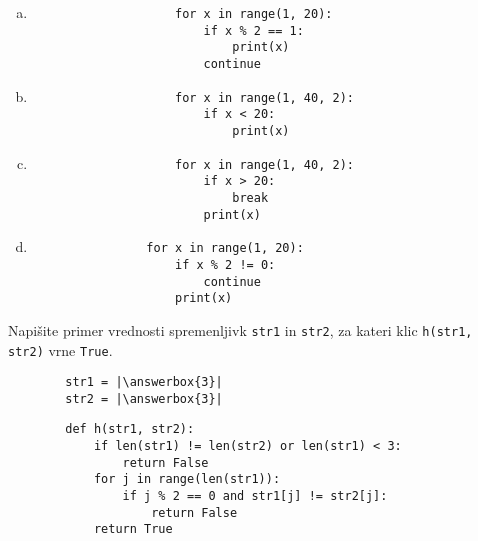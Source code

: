 \documentclass[arhiv, 10pt]{../izpit}
\newcommand{\inlinepy}[1]{\texttt{#1}}
\newcommand{\answerbox}[1]{\framebox{\vphantom{\large M}\hspace{#1cm}}}
\begin{document}
        \begin{multicols}{2}
        \begin{enumerate}[(a)]
\item 
                \begin{verbatim}
                    for x in range(1, 20):
                        if x % 2 == 1:
                            print(x)
                        continue
                \end{verbatim}
            
\item 
                \begin{verbatim}
                    for x in range(1, 40, 2):
                        if x < 20:
                            print(x)
                \end{verbatim}
            
\item 
                \begin{verbatim}
                    for x in range(1, 40, 2):
                        if x > 20:
                            break
                        print(x)
                \end{verbatim}
            
\item 
            \begin{verbatim}
                for x in range(1, 20):
                    if x % 2 != 0:
                        continue
                    print(x)
            \end{verbatim}
        
\end{enumerate}

        \end{multicols}
    
        \naloga*
        \begin{multicols}{2}
        \noindent
        Napišite primer vrednosti spremenljivk \inlinepy{str1} in \inlinepy{str2}, za kateri klic \inlinepy{h(str1, str2)} vrne \inlinepy{True}.
        \begin{verbatim}
        str1 = |\answerbox{3}|
        str2 = |\answerbox{3}|
        \end{verbatim}
        \vfil
        \columnbreak
        \begin{verbatim}
        def h(str1, str2):
            if len(str1) != len(str2) or len(str1) < 3:
                return False
            for j in range(len(str1)):
                if j % 2 == 0 and str1[j] != str2[j]:
                    return False
            return True
        \end{verbatim}
        \end{multicols}
    
\end{document}
